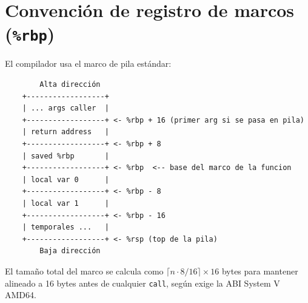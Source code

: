 \section{Convención de registro de marcos (\texttt{\%rbp})}

El compilador usa el marco de pila estándar:

\begin{verbatim}
        Alta dirección
    +------------------+
    | ... args caller  |
    +------------------+ <- %rbp + 16 (primer arg si se pasa en pila)
    | return address   |
    +------------------+ <- %rbp + 8
    | saved %rbp       |
    +------------------+ <- %rbp  <-- base del marco de la funcion
    | local var 0      |
    +------------------+ <- %rbp - 8
    | local var 1      |
    +------------------+ <- %rbp - 16
    | temporales ...   |
    +------------------+ <- %rsp (top de la pila)
        Baja dirección
\end{verbatim}

El tamaño total del marco se calcula como
$\lceil n \cdot 8 / 16 \rceil \times 16$ bytes para mantener
 alineado a 16 bytes antes de cualquier \texttt{call},
según exige la ABI System V AMD64.

